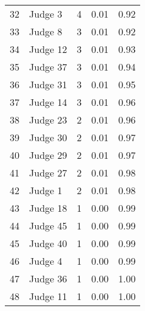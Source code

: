 \begin{tabular}{llrrr}
32 &   Judge 3 &   4 &   0.01 & 0.92 \\
33 &   Judge 8 &   3 &   0.01 & 0.92 \\
34 &  Judge 12 &   3 &   0.01 & 0.93 \\
35 &  Judge 37 &   3 &   0.01 & 0.94 \\
36 &  Judge 31 &   3 &   0.01 & 0.95 \\
37 &  Judge 14 &   3 &   0.01 & 0.96 \\
38 &  Judge 23 &   2 &   0.01 & 0.96 \\
39 &  Judge 30 &   2 &   0.01 & 0.97 \\
40 &  Judge 29 &   2 &   0.01 & 0.97 \\
41 &  Judge 27 &   2 &   0.01 & 0.98 \\
42 &   Judge 1 &   2 &   0.01 & 0.98 \\
43 &  Judge 18 &   1 &   0.00 & 0.99 \\
44 &  Judge 45 &   1 &   0.00 & 0.99 \\
45 &  Judge 40 &   1 &   0.00 & 0.99 \\
46 &   Judge 4 &   1 &   0.00 & 0.99 \\
47 &  Judge 36 &   1 &   0.00 & 1.00 \\
48 &  Judge 11 &   1 &   0.00 & 1.00 \\
\bottomrule
\end{tabular}
